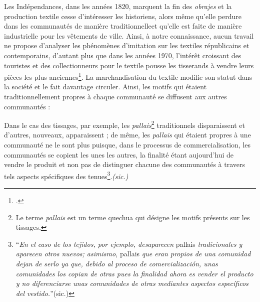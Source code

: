 Les Indépendances, dans les années 1820, marquent la fin des \textit{obrajes} et la production textile cesse d'intéresser les historiens, alors même qu'elle perdure dans les communautés de manière \og traditionnelle\fg \:et qu'elle est faite de manière industrielle pour les vêtements de ville. Ainsi, à notre connaissance, aucun travail ne propose d'analyser les phénomènes d'imitation sur les textiles républicains et contemporains, d'autant plus que dans les années 1970, l'intérêt croissant des touristes et des collectionneurs pour le textile pousse les tisserands à vendre leurs pièces les plus anciennes\footcite[p.~242]{zornModernTraditionsImpact1990}. La marchandisation du textile modifie son statut dans la société et le fait davantage circuler. Ainsi, les motifs qui étaient traditionnellement propres à chaque communauté se diffusent aux autres communautés : 
\begin{citer}
 Dans le cas des tissages, par exemple, les \textit{pallais}\footnote{Le terme \textit{pallais} est un terme quechua qui désigne les motifs présents sur les tissages.} traditionnels disparaissent et d'autres, nouveaux, apparaissent ; de même, les \textit{pallais} qui étaient propres à une communauté ne le sont plus puisque, dans le processus de commercialisation, les communautés se copient les unes les autres, la finalité étant aujourd'hui de vendre le produit et non pas de distinguer chacune des communautés à travers tels aspects spécifiques des tenues\footnote{\cite[p.~9-10]{contrerashernandezProduccionArtesanalAndes1982} \textquotedblleft \textit{En el caso de los tejidos, por ejemplo, desaparecen} pallais \textit{tradicionales y aparecen otros nuevos; asimismo,} pallais \textit{que eran propios de una comunidad dejan de serlo ya que, debido al proceso de comercialización, unas comunidades los copian de otras pues la finalidad ahora es vender el producto y no diferenciarse unas comunidades de otras mediantes aspectos específicos del vestido.}\textquotedblright \:(sic.)}.\textit{(sic.)}
\end{citer}

